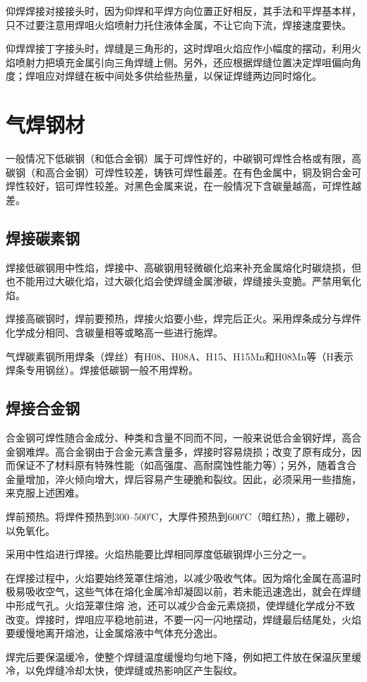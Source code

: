 \documentclass{ctexbook}
\begin{document}
仰焊焊接对接接头时，因为仰焊和平焊方向位置正好相反，其手法和平焊基本样，只不过要注意用焊咀火焰喷射力托住液体金属，不让它向下流，焊接速度要快。

仰焊焊接丁字接头时，焊缝是三角形的，这时焊咀火焰应作小幅度的摆动，利用火焰喷射力把填充金属引向三角焊缝上侧。另外，还应根据焊缝位置决定焊咀偏向角度；焊咀应对焊缝在板中间处多供给些热量，以保证焊缝两边同时熔化。
\section{气焊钢材}
一般情况下低碳钢（和低合金钢）属于可焊性好的，中碳钢可焊性合格或有限，高碳钢（和高合金钢）可焊性较差，铸铁可焊性最差。在有色金属中，铜及铜合金可焊性较好，铝可焊性较差。对黑色金属来说，在一般情况下含碳量越高，可焊性越差。
\subsection{焊接碳素钢}
焊接低碳钢用中性焰，焊接中、高碳钢用轻微碳化焰来补充金属熔化时碳烧损，但也不能用过大碳化焰，过大碳化焰会使焊缝金属渗碳，焊缝接头变脆。严禁用氧化焰。

焊接高碳钢时，焊前要预热，焊接火焰要小些，焊完后正火。采用焊条成分与焊件化学成分相同、含碳量相等或略高一些进行施焊。

气焊碳素钢所用焊条（焊丝）有H08、H08A、H15、H15Mn和H08Mn等（H表示焊条专用钢丝）。焊接低碳钢一般不用焊粉。
\subsection{焊接合金钢}
合金钢可焊性随合金成分、种类和含量不同而不同，一般来说低合金钢好焊，高合金钢难焊。高合金钢由于合金元素含量多，焊接时容易烧损；改变了原有成分，因而保证不了材料原有特殊性能（如高强度、高耐腐蚀性能力等）；另外，随着含合金量增加，淬火倾向增大，焊后容易产生硬脆和裂纹。因此，必须采用一些措施，来克服上述困难。

焊前预热。将焊件预热到300--500℃，大厚件预热到600℃（暗红热），撒上硼砂，以免氧化。

采用中性焰进行焊接。火焰热能要比焊相同厚度低碳钢焊小三分之一。

在焊接过程中，火焰要始终笼罩住熔池，以减少吸收气体。因为熔化金属在高温时极易吸收空气，这些气体在熔化金属冷却凝固以前，若未能迅速逸出，就会在焊缝中形成气孔。火焰笼罩住熔
池，还可以减少合金元素烧损，使焊缝化学成分不致改变。焊接时，焊咀应平稳地前进，不要一闪一闪地摆动，焊缝最后结尾处，火焰要缓慢地离开熔池，让金属熔液中气体充分逸出。

焊完后要保温缓冷，使整个焊缝温度缓慢均匀地下降，例如把工件放在保温灰里缓冷，以免焊缝冷却太快，使焊缝或热影响区产生裂纹。
\end{document}
